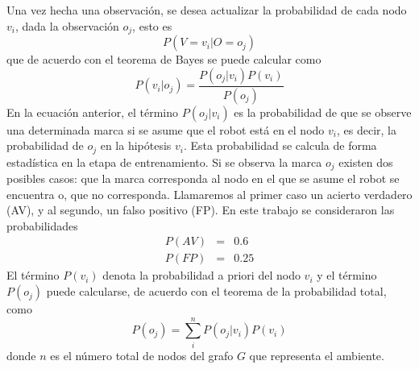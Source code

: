\documentclass[a4paper]{article}
\begin{document}
Una vez hecha una observación, se desea actualizar la probabilidad de cada nodo $v_i$, dada la observación $o_j$, esto es
\begin{equation}
P(V = v_i| O = o_j)
\end{equation}
que de acuerdo con el teorema de Bayes se puede calcular como
\begin{equation}
P(v_i| o_j) = \frac{P\left(o_j|v_i\right)P\left(v_i\right)}{P\left(o_j\right)}
\end{equation}
En la ecuación anterior, el término $P\left(o_j|v_i\right)$ es la probabilidad  de que se  observe una determinada marca si se asume que el robot está en el nodo $v_i$, es decir, la probabilidad de $o_j$ en la hipótesis $v_i$. Esta probabilidad se calcula de forma estadística en la etapa de entrenamiento. Si se observa la marca $o_j$ existen dos posibles casos: que la marca corresponda al nodo en el que se asume el robot se encuentra o, que no corresponda. Llamaremos al primer caso un acierto verdadero (AV), y al segundo, un falso positivo (FP). En este trabajo se consideraron las probabilidades
\begin{eqnarray}
P(AV)&=&0.6\\
P(FP)&=&0.25
\end{eqnarray}
El término $P\left(v_i\right)$ denota la probabilidad a priori del nodo $v_i$ y el término $P\left(o_j\right)$ puede calcularse, de acuerdo con el teorema de la probabilidad total, como
\begin{equation}
P\left(o_j\right) = \sum_i^n P\left(o_j|v_i\right)P\left(v_i\right)
\end{equation}
donde $n$ es el número total de nodos del grafo $G$ que representa el ambiente. 
\end{document}
